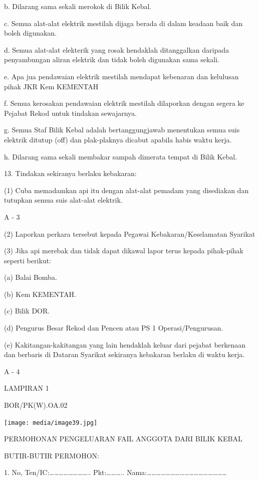 \documentclass[
]{article}
\begin{document}
b. Dilarang sama sekali merokok di Bilik Kebal.

c. Semua alat-alat elektrik mestilah dijaga berada di dalam keadaan baik
dan boleh digunakan.

d. Semua alat-alat elekterik yang rosak hendaklah ditanggalkan daripada
penyambungan aliran elektrik dan tidak boleh digunakan sama sekali.

e. Apa jua pendawaian elektrik mestilah mendapat kebenaran dan kelulusan
pihak JKR Kem KEMENTAH

f. Semua kerosakan pendawaian elektrik mestilah dilaporkan dengan segera
ke Pejabat Rekod untuk tindakan sewajarnya.

g. Semua Staf Bilik Kebal adalah bertanggungjawab menentukan semua suis
elektrik ditutup (off) dan plak-plaknya dicabut apabila habis waktu
kerja.

h. Dilarang sama sekali membakar sampah dimerata tempat di Bilik Kebal.

13. Tindakan sekiranya berlaku kebakaran:

(1) Cuba memadamkan api itu dengan alat-alat pemadam yang disediakan dan
tutupkan semua suis alat-alat elektrik.

A - 3

(2) Laporkan perkara tersebut kepada Pegawai Kebakaran/Keselamatan
Syarikat

(3) Jika api merebak dan tidak dapat dikawal lapor terus kepada
pihak-pihak seperti berikut:

(a) Balai Bomba.

(b) Kem KEMENTAH.

(c) Bilik DOR.

(d) Pengurus Besar Rekod dan Pencen atau PS 1 Operasi/Pengurusan.

(e) Kakitangan-kakitangan yang lain hendaklah keluar dari pejabat
berkenaan dan berbaris di Dataran Syarikat sekiranya kebakaran berlaku
di waktu kerja.

A - 4

{LAMPIRAN 1}

{BOR/PK(W).OA.02}

\texttt{[image: media/image39.jpg]}

PERMOHONAN PENGELUARAN FAIL ANGGOTA DARI BILIK KEBAL

BUTIR-BUTIR PERMOHON:

1. No, Ten/IC:\ldots\ldots\ldots\ldots\ldots\ldots\ldots\ldots..
Pkt:\ldots\ldots\ldots..
Nama:\ldots\ldots\ldots\ldots\ldots\ldots\ldots\ldots\ldots\ldots\ldots\ldots\ldots\ldots\ldots\ldots\ldots{}
\end{document}
